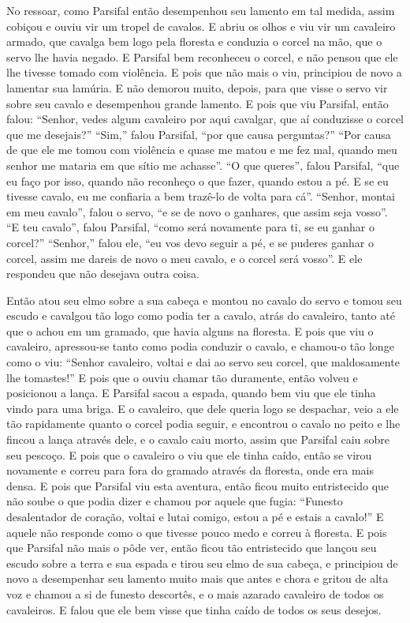 No ressoar, como Parsifal então desempenhou seu lamento em tal medida,
assim cobiçou e ouviu vir um tropel de cavalos. E abriu os olhos e viu vir um
cavaleiro armado, que cavalga bem logo pela floresta e conduzia o corcel na
mão, que o servo lhe havia negado. E Parsifal bem reconheceu o corcel, e não
pensou que ele lhe tivesse tomado com violência. E pois que não mais o viu,
principiou de novo a lamentar sua lamúria. E não demorou muito, depois, para
que visse o servo vir sobre seu cavalo e desempenhou grande lamento. E pois que
viu Parsifal, então falou: “Senhor, vedes algum cavaleiro por aqui cavalgar,
que aí conduzisse o corcel que me desejais?” “Sim,” falou Parsifal, “por que
causa perguntas?” “Por causa de que ele me tomou com violência e quase me matou
e me fez mal, quando meu senhor me mataria em que sítio me achasse”. “O que
queres”, falou Parsifal, “que eu faço por isso, quando não reconheço o que
fazer, quando estou a pé. E se eu tivesse cavalo, eu me confiaria a bem
trazê-lo de volta para cá”. “Senhor, montai em meu cavalo”, falou o servo, “e
se de novo o ganhares, que assim seja vosso”. “E teu cavalo”, falou Parsifal,
“como será novamente para ti, se eu ganhar o corcel?” “Senhor,” falou ele, “eu
vos devo seguir a pé, e se puderes ganhar o corcel, assim me dareis de novo o
meu cavalo, e o corcel será vosso”. E ele respondeu que não desejava outra
coisa. 

Então atou seu elmo sobre a sua cabeça e montou no cavalo do servo e tomou
seu escudo e cavalgou tão logo como podia ter a cavalo, atrás do cavaleiro,
tanto até que o achou em um gramado, que havia alguns na floresta. E pois que
viu o cavaleiro, apressou-se tanto como podia conduzir o cavalo, e chamou-o tão
longe como o viu: “Senhor cavaleiro, voltai e dai ao servo seu corcel, que
maldosamente lhe tomastes!” E pois que o ouviu chamar tão
duramente, então volveu e posicionou a lança. E Parsifal sacou a espada,
quando bem viu que ele tinha vindo para uma briga. E o cavaleiro, que dele
queria logo se despachar, veio a ele tão rapidamente quanto o corcel podia
seguir, e encontrou o cavalo no peito e lhe fincou a lança através dele, e o
cavalo caiu morto, assim que Parsifal caiu sobre seu pescoço. E pois que o
cavaleiro o viu que ele tinha caído, então se virou novamente e correu para
fora do gramado através da floresta, onde era mais densa. E pois que Parsifal
viu esta aventura, então ficou muito entristecido que não soube o que podia
dizer e chamou por aquele que fugia: “Funesto desalentador de coração, voltai e
lutai comigo, estou a pé e estais a cavalo!” E aquele não responde como o que
tivesse pouco medo e correu à floresta. E pois que Parsifal não mais o pôde
ver, então ficou tão entristecido que lançou seu escudo sobre a terra e sua
espada e tirou seu elmo de sua cabeça, e principiou de novo a desempenhar seu
lamento muito mais que antes e chora e gritou de alta voz e chamou a si de
funesto descortês, e o mais azarado cavaleiro de todos os cavaleiros.
E falou que ele bem visse que tinha caído de todos os seus desejos.

